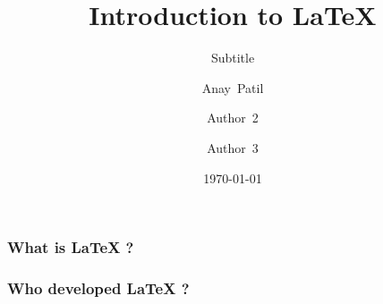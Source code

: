 \documentclass{beamer}
\begin{document}
    \begin{frame}
        \title{Introduction to \LaTeX{}}
        \author{Anay~Patil \and 
        Author~2 \and
        Author~3}
        \date{\today}
        \subtitle{Subtitle}
        \maketitle
    \end{frame}
    \begin{frame}
        \frametitle{What is LaTeX ?}
        \blindtext
    \end{frame}
    \begin{frame}
        \frametitle{Who developed LaTeX ?}
        \blindtext[1]
    \end{frame}
\end{document}
